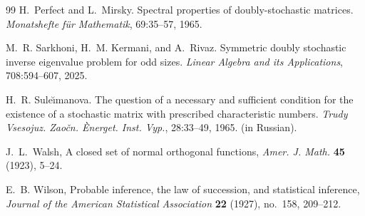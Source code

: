 \documentclass[12pt,fleqn]{amsart}
\theoremstyle{definition}
\theoremstyle{remark}
\newcommand{\1}{\mathbf{1}}
\begin{document}
\begin{thebibliography}{99}
H.~Perfect and L.~Mirsky.
\newblock Spectral properties of doubly-stochastic matrices.
\newblock \emph{Monatshefte f{\"u}r Mathematik}, 69:35--57, 1965.

M.~R. Sarkhoni, H.~M. Kermani, and A.~Rivaz.
\newblock Symmetric doubly stochastic inverse eigenvalue problem for odd sizes.
\newblock \emph{Linear Algebra and its Applications}, 708:594--607, 2025.

H.~R. Sule{\u{\i}}manova.
\newblock The question of a necessary and sufficient condition for the existence of a stochastic matrix with prescribed characteristic numbers.
\newblock \emph{Trudy Vsesojuz. Zaočn. Ènerget. Inst. Vyp.}, 28:33--49, 1965. (in Russian).

J.~L.~Walsh,
\newblock A closed set of normal orthogonal functions, \emph{Amer. J. Math.} \textbf{45} (1923), 5--24.

E.~B. Wilson, 
\newblock Probable inference, the law of succession, and statistical inference, 
\emph{Journal of the American Statistical Association} \textbf{22} (1927), no.~158, 209--212.

\end{thebibliography}
\end{document}

